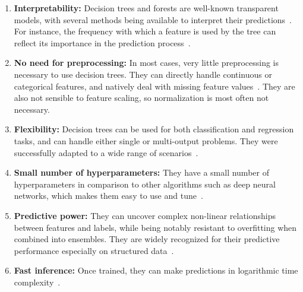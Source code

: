 \begin{itemize}
\begin{enumerate}
    \item \textbf{Interpretability:} Decision trees and forests are well-known transparent models, with several methods being available to interpret their predictions~\cite{breiman1984classification, lundberg2019explainable, agarwal2023mdi}. For instance, the frequency with which a feature is used by the tree can reflect its importance in the prediction process~\cite{breiman1984classification}.
    \item \textbf{No need for preprocessing:} In most cases, very little preprocessing is necessary to use decision trees. They can directly handle continuous or categorical features, and natively deal with missing feature values~\cite{breiman1984classification}. They are also not sensible to feature scaling, so normalization is most often not necessary.
    \item \textbf{Flexibility:} Decision trees can be used for both classification and regression tasks, and can handle either single or multi-output problems. They were successfully adapted to a wide range of scenarios~\cite{grinsztajn2022why}.
    \item \textbf{Small number of hyperparameters:}
    They have a small number of hyperparameters in comparison to other algorithms such as deep neural networks, which makes them easy to use and tune~\cite{zhou2019deep}. %
    \item \textbf{Predictive power:} They can uncover complex non-linear relationships between features and labels, while being notably resistant to overfitting when combined into ensembles. They are widely recognized for their predictive performance especially on structured data~\cite{grinsztajn2022why}.
    \item \textbf{Fast inference:} Once trained, they can make predictions in logarithmic time complexity~\cite{breiman1984classification}.
\end{enumerate}


\end{itemize}
